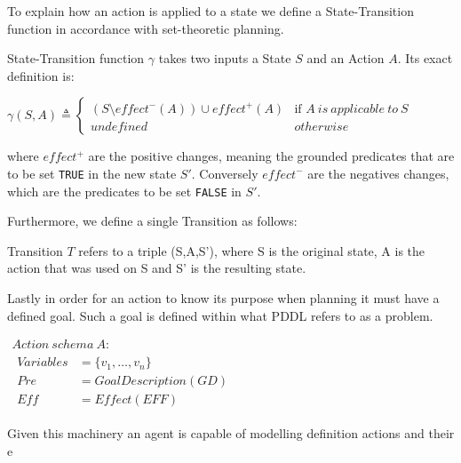 \documentclass[../Master.tex]{subfiles}
\begin{document}
To explain how an action is applied to a state we define a State-Transition function in accordance with set-theoretic planning.


\begin{definition} 
	State-Transition function $\gamma$ takes two inputs a State $S$ and an Action $A$. Its exact definition is:

	$\gamma(S,A) \triangleq 
	\left\{
	\begin{array}{ll}
		(S \setminus effect^-(A)) \cup effect^+(A) & \mbox{if } A~is~applicable~to~S  \\		
		undefined & otherwise 
	\end{array}
	\right.$ 
	
	where $effect^+$ are the positive changes, meaning the grounded predicates that are to be set \texttt{TRUE} in the new state $S'$. Conversely $effect^-$ are the negatives changes, which are the predicates to be set \texttt{FALSE} in $S'$. 
\end{definition}

Furthermore, we define a single Transition as follows:

\begin{definition} 
	Transition $T$ refers to a triple (S,A,S'), where S is the original state, A is the action that was used on S and S' is the resulting state.
\end{definition}

Lastly in order for an action to know its purpose when planning it must have a defined goal. Such a goal is defined within what PDDL refers to as a problem.

\begin{definition} 
	$
	\begin{array}{ll}
	Action ~ schema ~ A: & \\
	
	\begin{array}{ll}
	Variables & = \{v_1,\dots,v_n\}			 \\  
	Pre	& = Goal Description(GD) \\
	Eff & = Effect(EFF) 
	\end{array}
	\end{array}$
\end{definition}

Given this machinery an agent is capable of modelling  definition actions and their e
	
	
\end{document}
